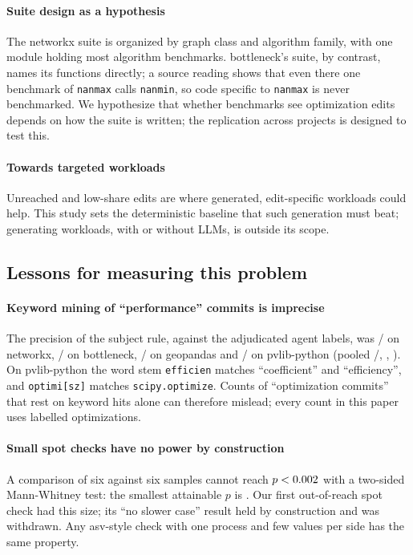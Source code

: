 \paragraph*{Suite design as a hypothesis}
The networkx suite is organized by graph class and algorithm family, with one module holding most algorithm benchmarks.
bottleneck's suite, by contrast, names its functions directly; a source reading shows that even there one benchmark of \texttt{nanmax} calls \texttt{nanmin}, so code specific to \texttt{nanmax} is never benchmarked.
We hypothesize that whether benchmarks see optimization edits depends on how the suite is written; the replication across projects is designed to test this.

\paragraph*{Towards targeted workloads}
Unreached and low-share edits are where generated, edit-specific workloads could help.
This study sets the deterministic baseline that such generation must beat; generating workloads, with or without LLMs, is outside its scope.

\subsection{Lessons for measuring this problem}
\label{sec:lessons}

\paragraph*{Keyword mining of ``performance'' commits is imprecise}
The precision of the subject rule, against the adjudicated agent labels, was \PrecNx/\PrecNxN{} on networkx, \PrecBn/\PrecBnN{} on bottleneck, \PrecGp/\PrecGpN{} on geopandas and \PrecPv/\PrecPvN{} on pvlib-python (pooled \PrecPooled/\PrecPooledN, \PrecPooledPct\pct, \ci{\PrecPooledLo}{\PrecPooledHi}).
On pvlib-python the word stem \texttt{efficien} matches ``coefficient'' and ``efficiency'', and \texttt{optimi[sz]} matches \texttt{scipy.optimize}.
Counts of ``optimization commits'' that rest on keyword hits alone can therefore mislead; every count in this paper uses labelled optimizations.

\paragraph*{Small spot checks have no power by construction}
A comparison of six against six samples cannot reach $p<0.002$ with a two-sided Mann-Whitney test: the smallest attainable $p$ is \MinPSixSix.
Our first out-of-reach spot check had this size; its ``no slower case'' result held by construction and was withdrawn.
Any asv-style check with one process and few values per side has the same property.

